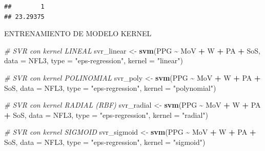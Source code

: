 \documentclass[
]{article}
\newenvironment{Shaded}{\begin{snugshade}}{\end{snugshade}}
\newcommand{\AttributeTok}[1]{\textcolor[rgb]{0.13,0.29,0.53}{#1}}
\newcommand{\CommentTok}[1]{\textcolor[rgb]{0.56,0.35,0.01}{\textit{#1}}}
\newcommand{\FunctionTok}[1]{\textcolor[rgb]{0.13,0.29,0.53}{\textbf{#1}}}
\newcommand{\NormalTok}[1]{#1}
\newcommand{\OtherTok}[1]{\textcolor[rgb]{0.56,0.35,0.01}{#1}}
\newcommand{\SpecialCharTok}[1]{\textcolor[rgb]{0.81,0.36,0.00}{\textbf{#1}}}
\newcommand{\StringTok}[1]{\textcolor[rgb]{0.31,0.60,0.02}{#1}}
\begin{document}
\begin{verbatim}
##        1 
## 23.29375
\end{verbatim}

ENTRENAMIENTO DE MODELO KERNEL

\begin{Shaded}
\begin{Highlighting}[]
\CommentTok{\# SVR con kernel LINEAL}
\NormalTok{svr\_linear }\OtherTok{\textless{}{-}} \FunctionTok{svm}\NormalTok{(PPG }\SpecialCharTok{\textasciitilde{}}\NormalTok{ MoV }\SpecialCharTok{+}\NormalTok{ W }\SpecialCharTok{+}\NormalTok{ PA }\SpecialCharTok{+}\NormalTok{ SoS, }\AttributeTok{data =}\NormalTok{ NFL3, }
                  \AttributeTok{type =} \StringTok{"eps{-}regression"}\NormalTok{, }\AttributeTok{kernel =} \StringTok{"linear"}\NormalTok{)}

\CommentTok{\# SVR con kernel POLINOMIAL}
\NormalTok{svr\_poly }\OtherTok{\textless{}{-}} \FunctionTok{svm}\NormalTok{(PPG }\SpecialCharTok{\textasciitilde{}}\NormalTok{ MoV }\SpecialCharTok{+}\NormalTok{ W }\SpecialCharTok{+}\NormalTok{ PA }\SpecialCharTok{+}\NormalTok{ SoS, }\AttributeTok{data =}\NormalTok{ NFL3, }
                \AttributeTok{type =} \StringTok{"eps{-}regression"}\NormalTok{, }\AttributeTok{kernel =} \StringTok{"polynomial"}\NormalTok{)}

\CommentTok{\# SVR con kernel RADIAL (RBF)}
\NormalTok{svr\_radial }\OtherTok{\textless{}{-}} \FunctionTok{svm}\NormalTok{(PPG }\SpecialCharTok{\textasciitilde{}}\NormalTok{ MoV }\SpecialCharTok{+}\NormalTok{ W }\SpecialCharTok{+}\NormalTok{ PA }\SpecialCharTok{+}\NormalTok{ SoS, }\AttributeTok{data =}\NormalTok{ NFL3, }
                  \AttributeTok{type =} \StringTok{"eps{-}regression"}\NormalTok{, }\AttributeTok{kernel =} \StringTok{"radial"}\NormalTok{)}

\CommentTok{\# SVR con kernel SIGMOID}
\NormalTok{svr\_sigmoid }\OtherTok{\textless{}{-}} \FunctionTok{svm}\NormalTok{(PPG }\SpecialCharTok{\textasciitilde{}}\NormalTok{ MoV }\SpecialCharTok{+}\NormalTok{ W }\SpecialCharTok{+}\NormalTok{ PA }\SpecialCharTok{+}\NormalTok{ SoS, }\AttributeTok{data =}\NormalTok{ NFL3, }
                   \AttributeTok{type =} \StringTok{"eps{-}regression"}\NormalTok{, }\AttributeTok{kernel =} \StringTok{"sigmoid"}\NormalTok{)}
\end{Highlighting}
\end{Shaded}
\end{document}
